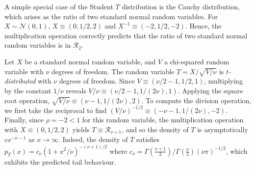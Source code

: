 \documentclass[../thesis.tex]{subfiles}
\begin{document}
\begin{example}
  A simple special case of the Student $T$ distribution is the Cauchy distribution, which arises as the ratio of two standard normal random variables. For $X\sim\mathcal{N}(0,1)$, $X \equiv (0,1/2,2)$ and $X^{-1} \equiv (-2,1/2,-2)$. %
  Hence, the multiplication operation correctly predicts that the ratio of two standard normal random variables is in $\mathcal{R}_2$.
\end{example}


\begin{example}
  Let $X$ be a standard normal random variable, and $V$ a chi-squared random variable with $\nu$ degrees of freedom. The random variable $T = X / \sqrt{V / \nu}$ is \emph{$t$-distributed} with $\nu$ degrees of freedom. Since $V \equiv (\nu/2-1,1/2,1)$, multiplying by the constant $1/\nu$ reveals $V / \nu \equiv (\nu/2-1,1/(2\nu),1)$. Applying the square root operation, $\sqrt{V / \nu} \equiv (\nu-1,1/(2\nu),2)$. To compute the division operation, we first take the reciprocal to find $(V/\nu)^{-1/2} \equiv (-\nu-1,1/(2\nu),-2)$. Finally, since $\rho = -2 < 1$ for this random variable, the multiplication operation with $X \equiv (0,1/2,2)$ yields $T \equiv \mathcal{R}_{\nu+1}$, and so the density of $T$ is asymptotically $c x^{-\nu-1}$ as $x \to \infty$.
  Indeed, the density of $T$ satisfies $p_T(x) = c_\nu (1 + x^2 / \nu)^{-(\nu+1)/2}$ where $c_\nu = \Gamma(\frac{\nu+1}{2})/\Gamma(\frac{\nu}{2}) (\nu\pi)^{-1/2}$, which exhibits the predicted tail behaviour.
\end{example}
\end{document}

